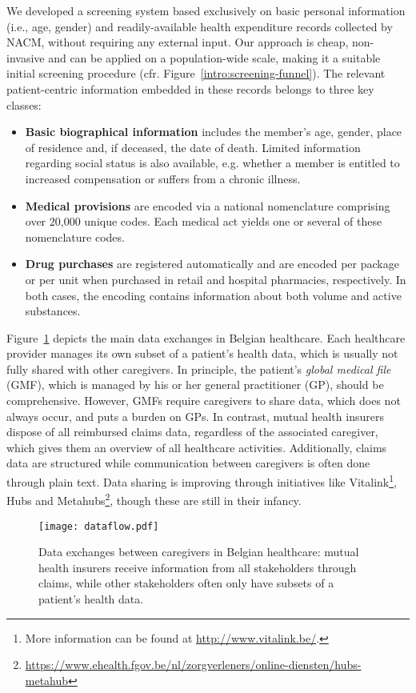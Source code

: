We developed a screening system based exclusively on basic personal information (i.e., age, gender) and readily-available health expenditure records collected by NACM, without requiring any external input. Our approach is cheap, non-invasive and can be applied on a population-wide scale, making it a suitable initial screening procedure (cfr. Figure~\ref{intro:screening-funnel}). The relevant patient-centric information embedded in these records belongs to three key classes:
\begin{itemize}
\item \textbf{Basic biographical information} includes the member's age, gender, place of residence and, if deceased, the date of death. Limited information regarding social status is also available, e.g. whether a member is entitled to increased compensation or suffers from a chronic illness.
\item \textbf{Medical provisions} are encoded via a national nomenclature comprising over 20,000 unique codes. Each medical act yields one or several of these nomenclature codes. 
\item \textbf{Drug purchases} are registered automatically and are encoded per package or per unit when purchased in retail and hospital pharmacies, respectively. In both cases, the encoding contains information about both volume and active substances. 
\end{itemize}

Figure~\ref{intro:dataflow} depicts the main data exchanges in Belgian healthcare. Each healthcare provider manages its own subset of a patient's health data, which is usually not fully shared with other caregivers. In principle, the patient's \emph{global medical file} (GMF), which is managed by his or her general practitioner (GP), should be comprehensive. However, GMFs require caregivers to share data, which does not always occur, and puts a burden on GPs. In contrast, mutual health insurers dispose of all reimbursed claims data, regardless of the associated caregiver, which gives them an overview of all healthcare activities. Additionally, claims data are structured while communication between caregivers is often done through plain text. Data sharing is improving through initiatives like Vitalink\footnote{More information can be found at \url{http://www.vitalink.be/}.}, Hubs and Metahubs\footnote{\url{https://www.ehealth.fgov.be/nl/zorgverleners/online-diensten/hubs-metahub}}, though these are still in their infancy.

\begin{figure}[!h]
  \centering
  \texttt{[image: dataflow.pdf]}
 \caption{Data exchanges between caregivers in Belgian healthcare: mutual health insurers receive information from all stakeholders through claims, while other stakeholders often only have subsets of a patient's health data.}
  \label{intro:dataflow}
\end{figure}

